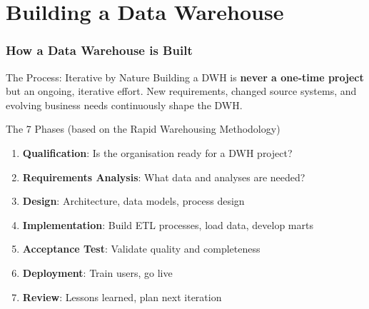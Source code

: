 \section{Building a Data Warehouse}


\begin{frame}
  \frametitle{How a Data Warehouse is Built}

  \begin{block}{The Process: Iterative by Nature}
    Building a DWH is \textbf{never a one-time project} but an ongoing,
    iterative effort.
    New requirements, changed source systems, and evolving business needs
    continuously shape the DWH.
  \end{block}

  \begin{block}{The 7 Phases (based on the Rapid Warehousing Methodology)}
    \begin{enumerate}
      \item \textbf{Qualification}: Is the organisation ready for a DWH project?
      \item \textbf{Requirements Analysis}: What data and analyses are needed?
      \item \textbf{Design}: Architecture, data models, process design
      \item \textbf{Implementation}: Build ETL processes, load data, develop marts
      \item \textbf{Acceptance Test}: Validate quality and completeness
      \item \textbf{Deployment}: Train users, go live
      \item \textbf{Review}: Lessons learned, plan next iteration
    \end{enumerate}
  \end{block}
\end{frame}


